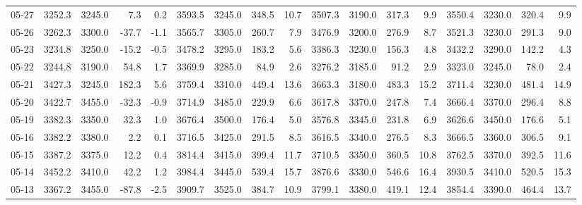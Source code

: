 \begin{threeparttable}
{\begin{tabular}{lrrrrrrrrrrrrrrrr}
  05-27 & 3252.3 & 3245.0 &        7.3 &            0.2 & 3593.5 & 3245.0 &      348.5 &           10.7 & 3507.3 & 3190.0 &      317.3 &            9.9 & 3550.4 & 3230.0 &       320.4 &              9.9 \\
  05-26 & 3262.3 & 3300.0 &      -37.7 &           -1.1 & 3565.7 & 3305.0 &      260.7 &            7.9 & 3476.9 & 3200.0 &      276.9 &            8.7 & 3521.3 & 3230.0 &       291.3 &              9.0 \\
  05-23 & 3234.8 & 3250.0 &      -15.2 &           -0.5 & 3478.2 & 3295.0 &      183.2 &            5.6 & 3386.3 & 3230.0 &      156.3 &            4.8 & 3432.2 & 3290.0 &       142.2 &              4.3 \\
  05-22 & 3244.8 & 3190.0 &       54.8 &            1.7 & 3369.9 & 3285.0 &       84.9 &            2.6 & 3276.2 & 3185.0 &       91.2 &            2.9 & 3323.0 & 3245.0 &        78.0 &              2.4 \\
  05-21 & 3427.3 & 3245.0 &      182.3 &            5.6 & 3759.4 & 3310.0 &      449.4 &           13.6 & 3663.3 & 3180.0 &      483.3 &           15.2 & 3711.4 & 3230.0 &       481.4 &             14.9 \\
  05-20 & 3422.7 & 3455.0 &      -32.3 &           -0.9 & 3714.9 & 3485.0 &      229.9 &            6.6 & 3617.8 & 3370.0 &      247.8 &            7.4 & 3666.4 & 3370.0 &       296.4 &              8.8 \\
  05-19 & 3382.3 & 3350.0 &       32.3 &            1.0 & 3676.4 & 3500.0 &      176.4 &            5.0 & 3576.8 & 3345.0 &      231.8 &            6.9 & 3626.6 & 3450.0 &       176.6 &              5.1 \\
  05-16 & 3382.2 & 3380.0 &        2.2 &            0.1 & 3716.5 & 3425.0 &      291.5 &            8.5 & 3616.5 & 3340.0 &      276.5 &            8.3 & 3666.5 & 3360.0 &       306.5 &              9.1 \\
  05-15 & 3387.2 & 3375.0 &       12.2 &            0.4 & 3814.4 & 3415.0 &      399.4 &           11.7 & 3710.5 & 3350.0 &      360.5 &           10.8 & 3762.5 & 3370.0 &       392.5 &             11.6 \\
  05-14 & 3452.2 & 3410.0 &       42.2 &            1.2 & 3984.4 & 3445.0 &      539.4 &           15.7 & 3876.6 & 3330.0 &      546.6 &           16.4 & 3930.5 & 3410.0 &       520.5 &             15.3 \\
  05-13 & 3367.2 & 3455.0 &      -87.8 &           -2.5 & 3909.7 & 3525.0 &      384.7 &           10.9 & 3799.1 & 3380.0 &      419.1 &           12.4 & 3854.4 & 3390.0 &       464.4 &             13.7 \\

\end{tabular}}
\end{threeparttable}
